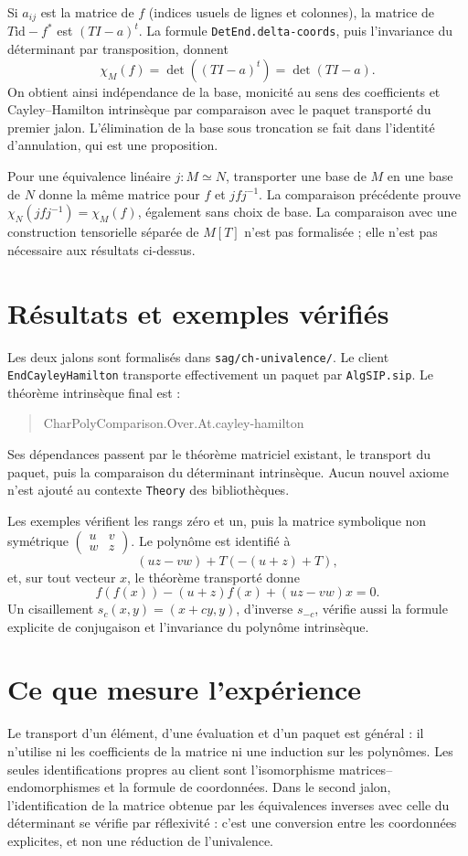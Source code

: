 \documentclass[11pt]{article}
\begin{document}
Si $a_{ij}$ est la matrice de $f$ (indices usuels de lignes et colonnes),
la matrice de $T\mathrm{id}-f^*$ est $(TI-a)^t$. La formule
\texttt{DetEnd.delta-coords}, puis l'invariance du déterminant par
transposition, donnent
\[
 \chi_M(f)=\det((TI-a)^t)=\det(TI-a).
\]
On obtient ainsi indépendance de la base, monicité au sens des coefficients
et Cayley--Hamilton intrinsèque par comparaison avec le paquet transporté
du premier jalon. L'élimination de la base sous troncation se fait dans
l'identité d'annulation, qui est une proposition.

Pour une équivalence linéaire $j:M\simeq N$, transporter une base de $M$
en une base de $N$ donne la même matrice pour $f$ et $jfj^{-1}$.
La comparaison précédente prouve
$\chi_N(jfj^{-1})=\chi_M(f)$, également sans choix de base.
La comparaison avec une construction tensorielle séparée de $M[T]$ n'est
pas formalisée ; elle n'est pas nécessaire aux résultats ci-dessus.

\section{Résultats et exemples vérifiés}
Les deux jalons sont formalisés dans \texttt{sag/ch-univalence/}.
Le client \texttt{EndCayleyHamilton} transporte effectivement un paquet
par \texttt{AlgSIP.sip}. Le théorème intrinsèque final est :
\begin{quote}\small\ttfamily
CharPolyComparison.Over.At.cayley-hamilton
\end{quote}
Ses dépendances passent
par le théorème matriciel existant, le transport du paquet, puis la
comparaison du déterminant intrinsèque. Aucun nouvel axiome n'est ajouté
au contexte \texttt{Theory} des bibliothèques.

Les exemples vérifient les rangs zéro et un, puis la matrice symbolique
non symétrique $\left(\begin{smallmatrix}u&v\\w&z\end{smallmatrix}\right)$.
Le polynôme est identifié à
\[
 (uz-vw)+T(-(u+z)+T),
\]
et, sur tout vecteur $x$, le théorème transporté donne
\[
 f(f(x))-(u+z)f(x)+(uz-vw)x=0.
\]
Un cisaillement $s_c(x,y)=(x+cy,y)$, d'inverse $s_{-c}$, vérifie aussi
la formule explicite de conjugaison et l'invariance du polynôme intrinsèque.

\section{Ce que mesure l'expérience}
Le transport d'un élément, d'une évaluation et d'un paquet est général :
il n'utilise ni les coefficients de la matrice ni une induction sur les
polynômes. Les seules identifications propres au client sont l'isomorphisme
matrices--endomorphismes et la formule de coordonnées. Dans le second
jalon, l'identification de la matrice obtenue par les équivalences inverses
avec celle du déterminant se vérifie par réflexivité : c'est une conversion
entre les coordonnées explicites, et non une réduction de l'univalence.
\end{document}
